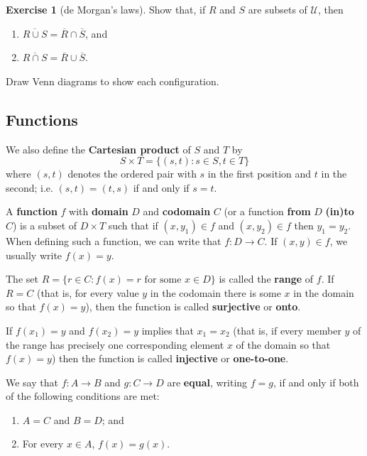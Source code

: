 \documentclass[a4paper,leqno]{article}
\numberwithin{equation}{section}
\theoremstyle{definition}
\newtheorem{exercise}[equation]{Exercise}
\theoremstyle{remark}
\newcommand{\df}[1]{\textbf{#1}}
\begin{document}
\begin{exercise}[de Morgan's laws]
  Show that, if $ R $ and $ S $ are subsets of $ \mathcal{U} $, then
  \begin{enumerate}
    \item $ \overline{R \cup S} = \overline{R} \cap \overline{S} $, and
    \item $ \overline{R \cap S} = \overline{R} \cup \overline{S} $.
  \end{enumerate}
  Draw Venn diagrams to show each configuration.
\end{exercise}

\subsection{Functions}
We also define the \df{Cartesian product} of $ S $ and $ T $ by
\begin{equation}
  S \times T = \{(s,t) : s \in S, t \in T\}
\end{equation}
where $ (s,t) $ denotes the ordered pair with $ s $ in the first position and $ t $ in the second; i.e. $ (s,t) = (t,s) $ if and only if $ s = t $.

A \df{function} $ f $ with \df{domain} $ D $ and \df{codomain} $ C $ (or a function \df{from} $ D $ \df{(in)to} $ C $) is a subset
of $ D \times T $ such that if $ (x,y_1) \in f $ and $ (x, y_2) \in f $ then $ y_1 = y_2 $. When defining such a function, we can
write that $ f : D \to C $. If $ (x,y) \in f $, we usually write $ f(x) = y $.

The set $ R = \{r \in C : f(x) = r \text{ for some } x \in D\} $ is called the \df{range} of $ f $. If $ R = C $ (that is, for every value $ y $
in the codomain there is some $ x $ in the domain so that $ f(x) = y $), then the function is called \df{surjective} or \df{onto}.

If $ f(x_1) = y $ and $ f(x_2) = y $ implies that $ x_1 = x_2 $ (that is, if every member $ y $ of the range has precisely one corresponding
element $ x $ of the domain so that $ f(x) = y $) then the function is called \df{injective} or \df{one-to-one}.

We say that $ f : A \to B $ and $ g : C \to D $ are \df{equal}, writing $ f = g $, if and only if both of the following conditions are met:
\begin{enumerate}
  \item $ A = C $ and $ B = D $; and
  \item For every $ x \in A $, $ f(x) = g(x) $.
\end{enumerate}
\end{document}
